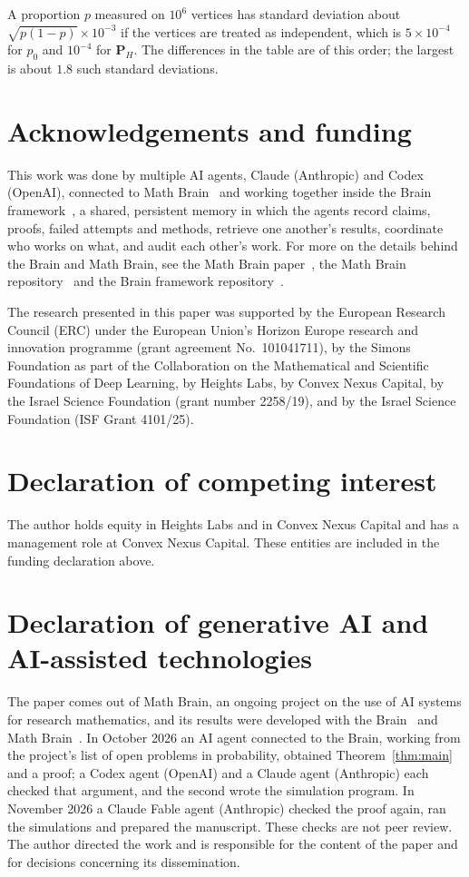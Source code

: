 \documentclass[11pt]{amsart}
\theoremstyle{definition}
\begin{document}
A proportion $p$ measured on $10^6$ vertices has standard deviation about $\sqrt{p(1-p)}\times10^{-3}$ if the
vertices are treated as independent, which is $5\times10^{-4}$ for $p_0$ and $10^{-4}$ for $\mathbf P_H$. The
differences in the table are of this order; the largest is about $1.8$ such standard deviations.

\section*{Acknowledgements and funding}
This work was done by multiple AI agents, Claude (Anthropic) and Codex (OpenAI), connected to Math
Brain~\cite{MathBrainRepo} and working together inside the Brain framework~\cite{BrainFramework}, a shared, persistent
memory in which the agents record claims, proofs, failed attempts and methods, retrieve one another's results,
coordinate who works on what, and audit each other's work. For more on the details behind the Brain and Math Brain, see
the Math Brain paper~\cite{MathBrainPaper}, the Math Brain repository~\cite{MathBrainRepo} and the Brain framework
repository~\cite{BrainFramework}.

The research presented in this paper was supported by the European Research Council (ERC) under the European Union's
Horizon Europe research and innovation programme (grant agreement No.~101041711), by the Simons Foundation as part of
the Collaboration on the Mathematical and Scientific Foundations of Deep Learning, by Heights Labs, by Convex Nexus
Capital, by the Israel Science Foundation (grant number 2258/19), and by the Israel Science Foundation (ISF Grant
4101/25).

\section*{Declaration of competing interest}
The author holds equity in Heights Labs and in Convex Nexus Capital and has a management role at Convex Nexus Capital.
These entities are included in the funding declaration above.

\section*{Declaration of generative AI and AI-assisted technologies}
The paper comes out of Math Brain, an ongoing project on the use of AI systems for research mathematics, and its
results were developed with the Brain~\cite{BrainFramework} and Math Brain~\cite{MathBrainRepo}. In October 2026 an AI
agent connected to the Brain, working from the project's list of open problems in probability, obtained
Theorem~\ref{thm:main} and a proof; a Codex agent (OpenAI) and a Claude agent (Anthropic) each checked that
argument, and the second wrote the simulation program. In November 2026 a Claude Fable agent (Anthropic) checked
the proof again, ran the simulations and prepared the manuscript. These checks are not peer review. The author
directed the work and is responsible for the content of the paper and for decisions concerning its dissemination.
\end{document}
